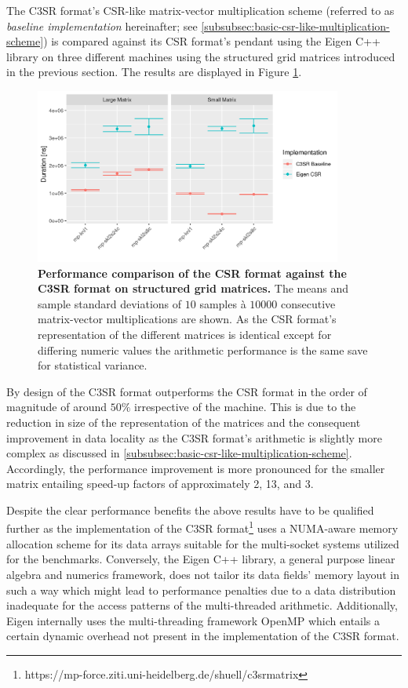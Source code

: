 \documentclass{article}
\begin{document}
    The C3SR format's CSR-like matrix-vector multiplication scheme (referred to as \emph{baseline implementation} hereinafter; see \ref{subsubsec:basic-csr-like-multiplication-scheme}) is compared against its CSR format's pendant using the Eigen C++ library \cite{eigen:website} on three different machines using the structured grid matrices introduced in the previous section. The results are displayed in Figure \ref{fig:baseline_arithmetic_performance}.

    \begin{figure}[!ht]
      \centering
      \includegraphics[width=0.9\textwidth]{assets/eigen_vs_c3sr_baseline}
      \caption[Performance comparison of the CSR format against the C3SR format on structured grid matrices.]{\textbf{Performance comparison of the CSR format against the C3SR format on structured grid matrices.} The means and sample standard deviations of $10$ samples à $10000$ consecutive matrix-vector multiplications are shown. As the CSR format's representation of the different matrices is identical except for differing numeric values the arithmetic performance is the same save for statistical variance.}
      \label{fig:baseline_arithmetic_performance}
    \end{figure}

    By design of the C3SR format outperforms the CSR format in the order of magnitude of around $50\%$ irrespective of the machine. This is due to the reduction in size of the representation of the matrices and the consequent improvement in data locality as the C3SR format's arithmetic is slightly more complex as discussed in \ref{subsubsec:basic-csr-like-multiplication-scheme}. Accordingly, the performance improvement is more pronounced for the smaller matrix entailing speed-up factors of approximately 2, 13, and 3.

    Despite the clear performance benefits the above results have to be qualified further as the implementation of the C3SR format\footnote{https://mp-force.ziti.uni-heidelberg.de/shuell/c3srmatrix} uses a NUMA-aware memory allocation scheme for its data arrays suitable for the multi-socket systems utilized for the benchmarks. Conversely, the Eigen C++ library, a general purpose linear algebra and numerics framework, does not tailor its data fields' memory layout in such a way which might lead to performance penalties due to a data distribution inadequate for the access patterns of the multi-threaded arithmetic. Additionally, Eigen internally uses the multi-threading framework OpenMP \cite{openmp:website} which entails a certain dynamic overhead not present in the implementation of the C3SR format.
\end{document}
